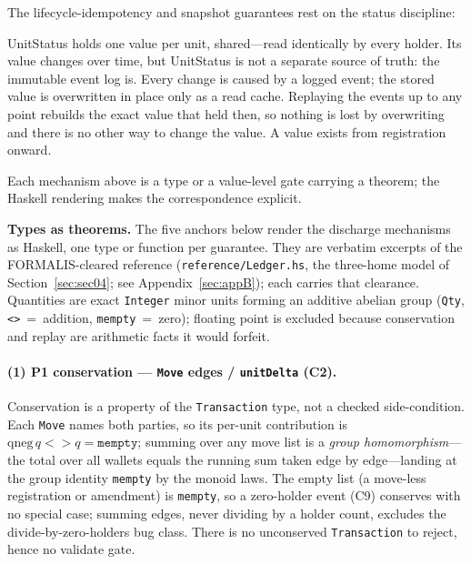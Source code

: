 The lifecycle-idempotency and snapshot guarantees rest on the status discipline:

\begin{remark}
UnitStatus holds one value per unit, shared---read identically by every holder. Its value changes over time, but UnitStatus is not a separate source of truth: the immutable event log is. Every change is caused by a logged event; the stored value is overwritten in place only as a read cache. Replaying the events up to any point rebuilds the exact value that held then, so nothing is lost by overwriting and there is no other way to change the value. A value exists from registration onward.
\end{remark}

Each mechanism above is a type or a value-level gate carrying a theorem; the Haskell rendering makes the correspondence explicit.

\noindent\textbf{Types as theorems.} The five anchors below render the discharge mechanisms as Haskell, one type or function per guarantee. They are verbatim excerpts of the FORMALIS-cleared reference (\texttt{reference/Ledger.hs}, the three-home model of Section~\ref{sec:sec04}; see Appendix~\ref{sec:appB}); each carries that clearance. Quantities are exact \texttt{Integer} minor units forming an additive abelian group (\texttt{Qty}, \texttt{<>}~=~addition, \texttt{mempty}~=~zero); floating point is excluded because conservation and replay are arithmetic facts it would forfeit.

\paragraph{(1) P1 conservation --- \texttt{Move} edges / \texttt{unitDelta} (C2).} Conservation is a property of the \texttt{Transaction} type, not a checked side-condition. Each \texttt{Move} names both parties, so its per-unit contribution is $\mathrm{qneg}\,q\mathbin{<\!\!>}q=\texttt{mempty}$; summing over any move list is a \emph{group homomorphism}---the total over all wallets equals the running sum taken edge by edge---landing at the group identity \texttt{mempty} by the monoid laws. The empty list (a move-less registration or amendment) is \texttt{mempty}, so a zero-holder event (C9) conserves with no special case; summing edges, never dividing by a holder count, excludes the divide-by-zero-holders bug class. There is no unconserved \texttt{Transaction} to reject, hence no validate gate.

